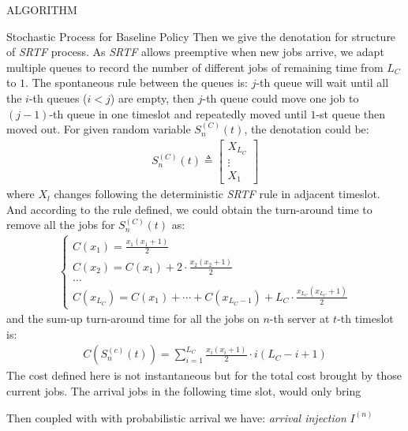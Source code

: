 \documentclass[10pt, conference, letterpaper]{IEEEtran}
\begin{document}
\begin{section}{ALGORITHM}
\begin{subsection}{Stochastic Process for Baseline Policy}
            Then we give the denotation for structure of \emph{SRTF} process. As \emph{SRTF} allows preemptive when new jobs arrive, we adapt multiple queues to record the number of different jobs of remaining time from $L_C$ to $1$. The spontaneous rule between the queues is: $j$-th queue will wait until all the $i$-th queues ($i < j$) are empty, then $j$-th queue could move one job to $(j-1)$-th queue in one timeslot and repeatedly moved until $1$-st queue then moved out.
            For given random variable $S^{(C)}_{n}(t)$, the denotation could be:
            \begin{align}
                S^{(C)}_{n}(t) \triangleq \begin{bmatrix}
                    X_{L_C} \\ \vdots \\X_{1}
                \end{bmatrix}
            \end{align}
            where $X_{l}$ changes following the deterministic \emph{SRTF} rule in adjacent timeslot. And according to the rule defined, we could obtain the turn-around time to remove all the jobs for $S^{(C)}_{n}(t)$ as:
            \begin{align}
                \begin{cases}
                    C(x_{1}) = \frac{x_1(x_1+1)}{2}
                    \\
                    C(x_{2}) = C(x_{1}) + 2 \cdot \frac{x_2(x_2+1)}{2}
                    \\
                    \dots
                    \\
                    C(x_{L_C}) = C(x_{1}) + \cdots + C(x_{L_C-1}) + L_C \cdot \frac{x_{L_C}(x_{L_C}+1)}{2}
                \end{cases}
            \end{align}
            and the sum-up turn-around time for all the jobs on $n$-th server at $t$-th timeslot is:
            \begin{align}
                C(S^{(c)}_{n}(t)) = \sum_{i=1}^{L_C} \frac{x_i(x_i+1)}{2} \cdot i(L_C-i+1)
            \end{align}
            The cost defined here is not instantaneous but for the total cost brought by those current jobs. The arrival jobs in the following time slot, would only bring 

            Then coupled with with probabilistic arrival we have:
            \emph{arrival injection} $I^{(n)}$


\end{subsection}
\end{section}
\end{document}
